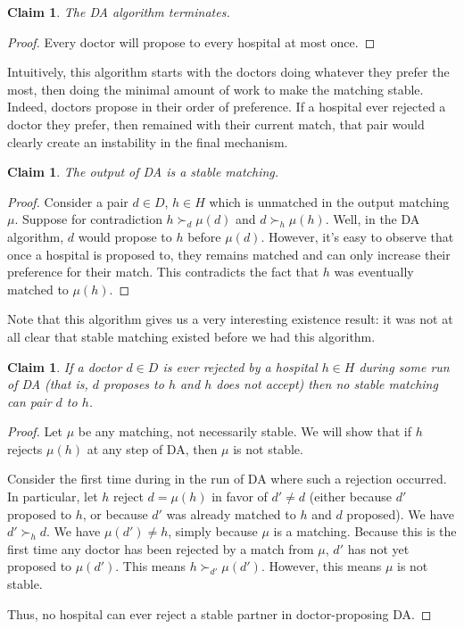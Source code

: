 \documentclass[12pt]{article}
\newtheorem{claim}[definition]{Claim}
\begin{document}
\begin{claim}
  The DA algorithm terminates.
\end{claim}
\begin{proof}
  Every doctor will propose to every hospital at most once.
\end{proof}

Intuitively, this algorithm starts with the doctors doing whatever they prefer
the most, then doing the minimal amount of work to make the matching stable.
Indeed, doctors propose in their order of preference. If a hospital ever
rejected a doctor they prefer, then remained with their current match,
that pair would clearly create an instability in the final mechanism.

\begin{claim}
  The output of DA is a stable matching.
\end{claim}
\begin{proof}
  Consider a pair $d\in D$, $h\in H$ which is unmatched in the output matching
  $\mu$. Suppose for contradiction $h\succ_d \mu(d)$ and $d\succ_h \mu(h)$.
  Well, in the DA algorithm, $d$ would propose to $h$ before $\mu(d)$.
  However, it's easy to observe that once a hospital is proposed to,
  they remains matched and can only increase their preference for their match.
  This contradicts the fact that $h$ was eventually matched to $\mu(h)$.
\end{proof}

Note that this algorithm gives us a very interesting existence result: it was
not at all clear that stable matching existed before we had this algorithm.

\begin{claim}
  If a doctor $d\in D$ is ever rejected by a hospital $h\in H$ during some run
  of DA (that is, $d$ proposes to $h$ and $h$ does not accept) then no stable
  matching can pair $d$ to $h$.
\end{claim}
\begin{proof}
  Let $\mu$ be any matching, not necessarily stable. We will show that if $h$
  rejects $\mu(h)$ at any step of DA, then $\mu$ is not stable.

  Consider the first time during in the run of DA where such a rejection occurred.
  In particular, let $h$ reject $d=\mu(h)$ in favor of $d'\ne d$ 
  (either because $d'$ proposed to $h$,
  or because $d'$ was already matched to $h$ and $d$ proposed).
  We have $d'\succ_h d$.
  We have $\mu(d')\ne h$, simply because $\mu$ is a matching.
  Because this is the first time any doctor has been rejected by a match from
  $\mu$, $d'$ has not yet proposed to $\mu(d')$.
  This means $h \succ_{d'} \mu(d')$. However, this means $\mu$ is not stable.

  Thus, no hospital can ever reject a stable partner in doctor-proposing DA.
\end{proof}
\end{document}

